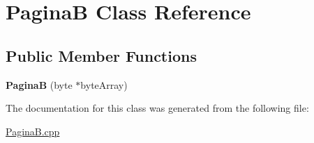 \hypertarget{class_pagina_b}{}\section{PaginaB Class Reference}
\label{class_pagina_b}
\subsection*{Public Member Functions}
\begin{DoxyCompactItemize}
\item 
\mbox{\label{class_pagina_b_a8571fd70b9931aff9fedf665f119a673}} 
{\bfseries PaginaB} (byte $\ast$byte\+Array)
\end{DoxyCompactItemize}


The documentation for this class was generated from the following file\+:\begin{DoxyCompactItemize}
\item 
\mbox{\hyperlink{_pagina_b_8cpp}{Pagina\+B.\+cpp}}\end{DoxyCompactItemize}

